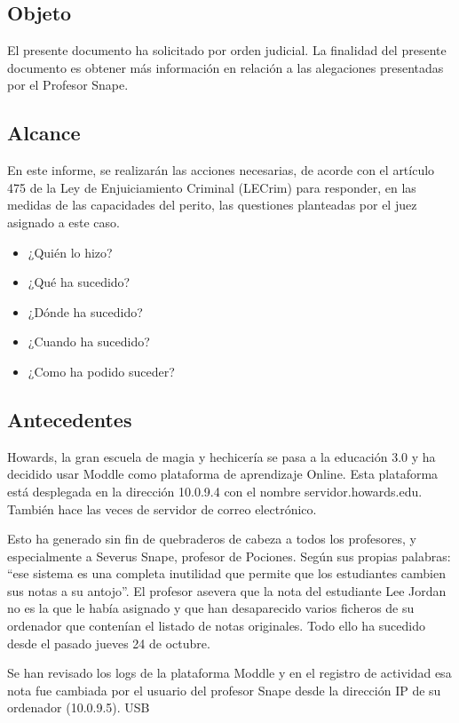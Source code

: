 \subsection{Objeto}

El presente documento ha solicitado por orden judicial.
La finalidad del presente documento es obtener más información en relación a las alegaciones presentadas por el Profesor Snape.

\subsection{Alcance}

En este informe, se realizarán las acciones necesarias, de acorde con el artículo 475 de la Ley de Enjuiciamiento Criminal (LECrim) para responder, en las medidas de las capacidades del perito, las questiones planteadas por el juez asignado a este caso. 

\begin{itemize}
\item{¿Quién lo hizo?}
\item{¿Qué ha sucedido?}
\item{¿Dónde ha sucedido?}
\item{¿Cuando ha sucedido?}
\item{¿Como ha podido suceder?}
\end{itemize}


\subsection{Antecedentes}

Howards, la gran escuela de magia y hechicería se pasa a la educación 3.0 y ha decidido usar
Moddle como plataforma de aprendizaje Online. Esta plataforma está desplegada en la dirección
10.0.9.4 con el nombre servidor.howards.edu. También hace las veces de servidor de correo
electrónico.\par
Esto ha generado sin fin de quebraderos de cabeza a todos los profesores, y especialmente a
Severus Snape, profesor de Pociones. Según sus propias palabras: “ese sistema es una completa
inutilidad que permite que los estudiantes cambien sus notas a su antojo”. El profesor asevera 
que la nota del estudiante Lee Jordan no es la que le había asignado y que han desaparecido
varios ficheros de su ordenador que contenían el listado de notas originales. Todo ello ha
sucedido desde el pasado jueves 24 de octubre.\par
Se han revisado los logs de la plataforma Moddle y en el registro de actividad esa nota fue
cambiada por el usuario del profesor Snape desde la dirección IP de su ordenador (10.0.9.5).
\gls{USB}

